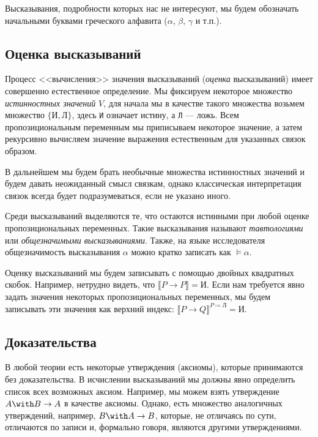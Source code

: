 Высказывания, подробности
которых нас не интересуют, мы будем обозначать начальными буквами греческого алфавита
($\alpha$, $\beta$, $\gamma$ и т.п.).

\subsection{Оценка высказываний}

Процесс <<вычисления>> значения высказываний (\emph{оценка} высказываний) имеет совершенно
естественное определение. Мы фиксируем некоторое множество
\emph{истинностных значений} $V$, для начала мы в качестве такого множества возьмем 
множество $\{\texttt{И}, \texttt{Л}\}$, здесь \texttt{И} означает истину, а
\texttt{Л} --- ложь. Всем пропозициональным переменным мы приписываем некоторое
значение, а затем рекурсивно вычисляем значение выражения естественным для указанных
связок образом.

В дальнейшем мы будем брать необычные множества истинностных значений и будем давать
неожиданный смысл связкам, однако классическая интерпретация связок всегда будет
подразумеваться, если не указано иного.

Среди высказываний выделяются те, что остаются истинными при любой оценке пропозициональных
переменных. Такие высказывания называют \emph{тавтологиями} или \emph{общезначимыми высказываниями}.
Также, на языке исследователя общезначимость высказывания $\alpha$ можно кратко 
записать как $\models \alpha$. 

Оценку высказываний мы будем записывать с помощью двойных квадратных скобок. Например,
нетрудно видеть, что $\llbracket P \rightarrow P \rrbracket = \texttt{И}$.
Если нам требуется явно задать значения некоторых пропозициональных переменных, мы будем
записывать эти значения как верхний индекс: $\llbracket P \rightarrow Q \rrbracket ^ {P\coloneqq \texttt{Л}} = \texttt{И}$.

\subsection{Доказательства}

В любой теории есть некоторые утверждения (аксиомы), которые принимаются без доказательства.
В исчислении высказываний мы должны явно определить список всех возможных аксиом. 
Например, мы можем взять утверждение $A \with B \rightarrow A$ в качестве аксиомы.
Однако, есть множество аналогичных утверждений, например, $B \with A \rightarrow B$,
которые, не отличаясь по сути, отличаются по записи и, формально говоря, являются другими
утверждениями.

